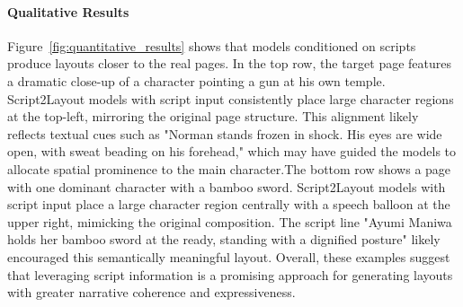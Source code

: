 \paragraph{Qualitative Results}
Figure~\ref{fig:quantitative_results} shows that models conditioned on scripts produce layouts closer to the real pages. In the top row, the target page features a dramatic close-up of a character pointing a gun at his own temple. Script2Layout models with script input consistently place large character regions at the top-left, mirroring the original page structure. This alignment likely reflects textual cues such as "Norman stands frozen in shock. His eyes are wide open, with sweat beading on his forehead," which may have guided the models to allocate spatial prominence to the main character.The bottom row shows a page with one dominant character with a bamboo sword. Script2Layout models with script input place a large character region centrally with a speech balloon at the upper right, mimicking the original composition.  The script line "Ayumi Maniwa holds her bamboo sword at the ready, standing with a dignified posture" likely encouraged this semantically meaningful layout. Overall, these examples suggest that leveraging script information is a promising approach for generating layouts with greater narrative coherence and expressiveness.


